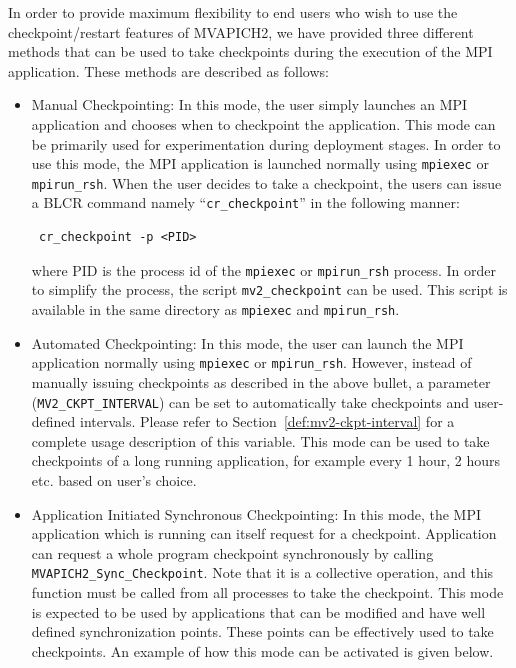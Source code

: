 In order to provide maximum flexibility to end users who wish to use the
checkpoint/restart features of MVAPICH2, we have provided three different
methods that can be used to take checkpoints during the execution of the MPI
application. These methods are described as follows:

\begin{itemize}
    \item Manual Checkpointing: In this mode, the user simply launches an MPI
    application and chooses when to checkpoint the application. This mode can be
    primarily used for experimentation during deployment stages. In order to use
    this mode, the MPI application is launched normally using \texttt{mpiexec}
    or \texttt{mpirun\_rsh}.  When the user decides to take a checkpoint, the
    users can issue a BLCR command namely ``\texttt{cr\_checkpoint}'' in the
    following manner:

    \begin{verbatim} cr_checkpoint -p <PID> \end{verbatim}

    where PID is the process id of the \texttt{mpiexec} or \texttt{mpirun\_rsh}
    process. In order to simplify the process, the script
    \texttt{mv2\_checkpoint} can be used. This script is available in the same
    directory as \texttt{mpiexec} and \texttt{mpirun\_rsh}.

    \item Automated Checkpointing: In this mode, the user can launch the MPI
    application normally using \texttt{mpiexec} or \texttt{mpirun\_rsh}.
    However, instead of manually issuing checkpoints as described in the above
    bullet, a parameter (\texttt{MV2\_CKPT\_INTERVAL}) can be set to
    automatically take checkpoints and user-defined intervals. Please refer to
    Section~\ref{def:mv2-ckpt-interval} for a complete usage description of this
    variable. This mode can be used to take checkpoints of a long running
    application, for example every 1 hour, 2 hours etc. based on user's choice.

    \item Application Initiated Synchronous Checkpointing: In this mode, the MPI
    application which is running can itself request for a checkpoint.
    Application can request a whole program checkpoint synchronously by calling
    \texttt{MVAPICH2\_Sync\_Checkpoint}. Note that it is a collective operation,
    and this function must be called from all processes to take the checkpoint.
    This mode is expected to be used by applications that can be modified and
    have well defined synchronization points. These points can be effectively
    used to take checkpoints. An example of how this mode can be activated is
    given below.


\end{itemize}

